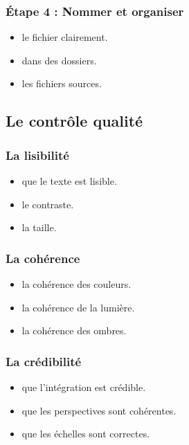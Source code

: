 \subsubsection{Étape 4 : Nommer et organiser}

\begin{itemize}
    \item {} le fichier clairement.
    \item {} dans des dossiers.
    \item {} les fichiers sources.
\end{itemize}

\subsection{Le contrôle qualité}

\subsubsection{La lisibilité}

\begin{itemize}
    \item {} que le texte est lisible.
    \item {} le contraste.
    \item {} la taille.
\end{itemize}

\subsubsection{La cohérence}

\begin{itemize}
    \item {} la cohérence des couleurs.
    \item {} la cohérence de la lumière.
    \item {} la cohérence des ombres.
\end{itemize}

\subsubsection{La crédibilité}

\begin{itemize}
    \item {} que l'intégration est crédible.
    \item {} que les perspectives sont cohérentes.
    \item {} que les échelles sont correctes.
\end{itemize}

